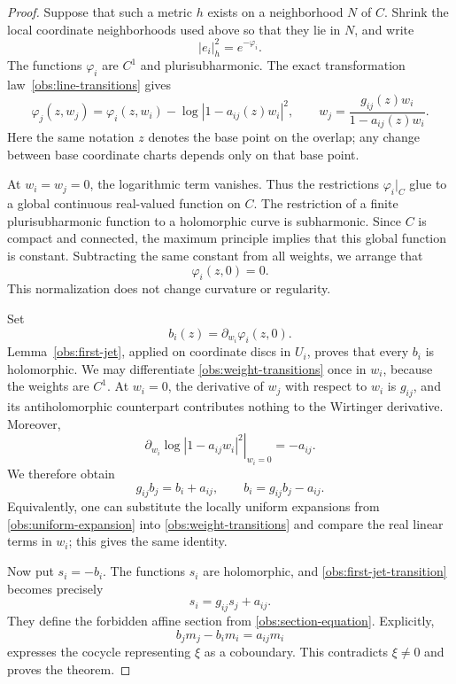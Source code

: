 \documentclass[11pt,a4paper]{article}
\numberwithin{equation}{section}
\theoremstyle{definition}
\theoremstyle{remark}
\begin{document}
\begin{proof}
Suppose that such a metric $h$ exists on a neighborhood $N$ of $C$.
Shrink the local coordinate neighborhoods used above so that they lie
in $N$, and write
\[
                        |e_i|_h^2=e^{-\varphi_i}.
\]
The functions $\varphi_i$ are $C^1$ and plurisubharmonic.  The exact
transformation law~\eqref{obs:line-transitions} gives
\begin{equation}
\label{obs:weight-transitions}
 \varphi_j(z,w_j)
    =\varphi_i(z,w_i)-\log|1-a_{ij}(z)w_i|^2,
 \qquad
 w_j=\frac{g_{ij}(z)w_i}{1-a_{ij}(z)w_i}.
\end{equation}
Here the same notation $z$ denotes the base point on the overlap; any
change between base coordinate charts depends only on that base point.

At $w_i=w_j=0$, the logarithmic term vanishes.  Thus the restrictions
$\varphi_i|_C$ glue to a global continuous real-valued function on $C$.
The restriction of a finite plurisubharmonic function to a holomorphic
curve is subharmonic.  Since $C$ is compact and connected, the maximum
principle implies that this global function is constant.  Subtracting
the same constant from all weights, we arrange that
\begin{equation}
\label{obs:zero-restriction}
                         \varphi_i(z,0)=0.
\end{equation}
This normalization does not change curvature or regularity.

Set
\[
                       b_i(z)=\partial_{w_i}\varphi_i(z,0).
\]
Lemma~\ref{obs:first-jet}, applied on coordinate discs in $U_i$, proves
that every $b_i$ is holomorphic.  We may differentiate
\eqref{obs:weight-transitions} once in $w_i$, because the weights are
$C^1$.  At $w_i=0$, the derivative of $w_j$ with respect to $w_i$ is
$g_{ij}$, and its antiholomorphic counterpart contributes nothing to
the Wirtinger derivative.  Moreover,
\[
 \left.\partial_{w_i}\log|1-a_{ij}w_i|^2\right|_{w_i=0}
                  =-a_{ij}.
\]
We therefore obtain
\begin{equation}
\label{obs:first-jet-transition}
                    g_{ij}b_j=b_i+a_{ij},
                    \qquad b_i=g_{ij}b_j-a_{ij}.
\end{equation}
Equivalently, one can substitute the locally uniform expansions from
\eqref{obs:uniform-expansion} into
\eqref{obs:weight-transitions} and compare the real linear terms in
$w_i$; this gives the same identity.

Now put $s_i=-b_i$.  The functions $s_i$ are holomorphic, and
\eqref{obs:first-jet-transition} becomes precisely
\[
                         s_i=g_{ij}s_j+a_{ij}.
\]
They define the forbidden affine section from
\eqref{obs:section-equation}.  Explicitly,
\[
                  b_jm_j-b_im_i=a_{ij}m_i
\]
expresses the cocycle representing $\xi$ as a coboundary.  This
contradicts $\xi\ne0$ and proves the theorem.
\end{proof}
\end{document}
